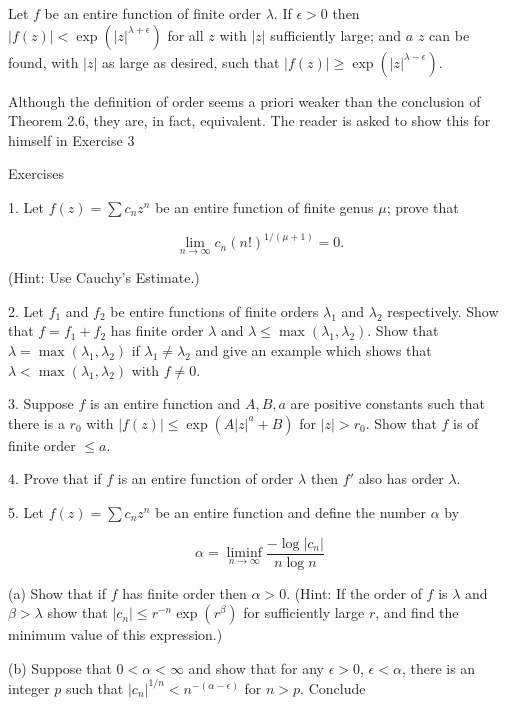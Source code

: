 Let $f$ be an entire function of finite order $\lambda$. If $\epsilon > 0$ then $|f(z)| < \exp (|z|^{\lambda+\epsilon})$ for all $z$ with $|z|$ sufficiently large; and $a$ $z$ can be found, with $|z|$ as large as desired, such that $|f(z)| \geq \exp (|z|^{\lambda-\epsilon})$.

Although the definition of order seems a priori weaker than the conclusion of Theorem 2.6, they are, in fact, equivalent. The reader is asked to show this for himself in Exercise 3

Exercises

1. Let $f(z) = \sum c_n z^n$ be an entire function of finite genus $\mu$; prove that

$$\lim_{n \to \infty} c_n (n!)^{1/(\mu+1)} = 0.$$

(Hint: Use Cauchy's Estimate.)

2. Let $f_1$ and $f_2$ be entire functions of finite orders $\lambda_1$ and $\lambda_2$ respectively. Show that $f = f_1 + f_2$ has finite order $\lambda$ and $\lambda \leq \max (\lambda_1, \lambda_2)$. Show that $\lambda = \max (\lambda_1, \lambda_2)$ if $\lambda_1 \neq \lambda_2$ and give an example which shows that $\lambda < \max (\lambda_1, \lambda_2)$ with $f \neq 0$.

3. Suppose $f$ is an entire function and $A, B, a$ are positive constants such that there is a $r_0$ with $|f(z)| \leq \exp(A|z|^a + B)$ for $|z| > r_0$. Show that $f$ is of finite order $\leq a$.

4. Prove that if $f$ is an entire function of order $\lambda$ then $f'$ also has order $\lambda$.

5. Let $f(z) = \sum c_n z^n$ be an entire function and define the number $\alpha$ by

$$\alpha = \liminf_{n \to \infty} \frac{-\log |c_n|}{n \log n}$$

(a) Show that if $f$ has finite order then $\alpha > 0$. (Hint: If the order of $f$ is $\lambda$ and $\beta > \lambda$ show that $|c_n| \leq r^{-n} \exp(r^\beta)$ for sufficiently large $r$, and find the minimum value of this expression.)

(b) Suppose that $0 < \alpha < \infty$ and show that for any $\epsilon > 0$, $\epsilon < \alpha$, there is an integer $p$ such that $|c_n|^{1/n} < n^{-(\alpha-\epsilon)}$ for $n > p$. Conclude